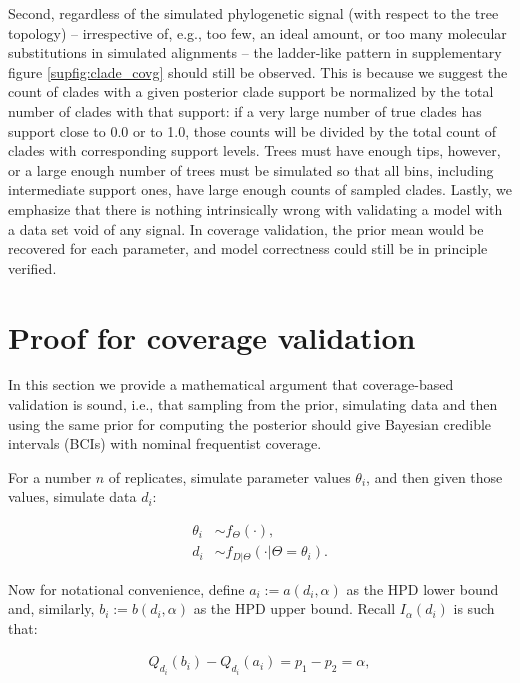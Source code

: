 \documentclass[oneside]{article}
\begin{document}
Second, regardless of the simulated phylogenetic signal (with respect to the tree topology) -- irrespective of, e.g., too few, an ideal amount, or too many molecular substitutions in simulated alignments -- the ladder-like pattern in supplementary figure \ref{supfig:clade_covg} should still be observed.
This is because we suggest the count of clades with a given posterior clade support be normalized by the total number of clades with that support: if a very large number of true clades has support close to 0.0 or to 1.0, those counts will be divided by the total count of clades with corresponding support levels.
Trees must have enough tips, however, or a large enough number of trees must be simulated so that all bins, including intermediate support ones, have large enough counts of sampled clades.
Lastly, we emphasize that there is nothing intrinsically wrong with validating a model with a data set void of any signal.
In coverage validation, the prior mean would be recovered for each parameter, and model correctness could still be in principle verified.

\newpage
\section{Proof for coverage validation}
 \label{appendix::sec:proofs}

In this section we provide a mathematical argument that coverage-based validation is sound, i.e., that sampling from the prior, simulating data and then using the same prior for computing the posterior should give Bayesian credible intervals (BCIs) with nominal frequentist coverage.

For a number $n$ of replicates, simulate parameter
  values $\theta_i$, and then given those values, simulate data $d_i$:

\begin{align*}
\theta_i & \sim f_\Theta(\cdot), \\
d_i & \sim f_{D|\Theta}(\cdot | \Theta=\theta_i).
\end{align*}

Now for notational convenience, define $a_i := a(d_i, \alpha)$ as the HPD lower bound and, similarly, $b_i := b(d_i, \alpha)$ as the HPD upper bound.
Recall $I_{\alpha}\left(d_i\right)$ is such that:


\begin{align*}
Q_{d_i}\left(b_i\right) - Q_{d_i}\left(a_i\right) = p_1 - p_2 = \alpha,
\end{align*}
\end{document}
